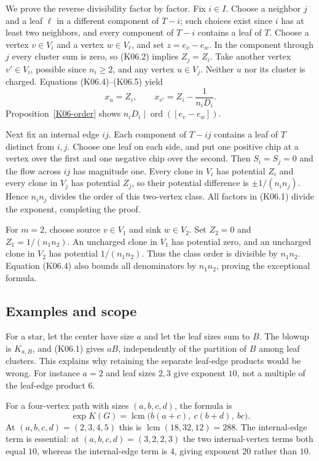 \documentclass[11pt,a4paper]{article}
\theoremstyle{definition}\newtheorem{definition}[theorem]{Definition}
\theoremstyle{remark}\newtheorem{remark}[theorem]{Remark}
\DeclareMathOperator{\ord}{ord}\DeclareMathOperator{\lcm}{lcm}\DeclareMathOperator{\im}{im}
\numberwithin{equation}{section}
\begin{document}
We prove the reverse divisibility factor by factor. Fix $i\in I$. Choose a neighbor $j$ and a leaf $\ell$ in a different component of $T-i$; such choices exist since $i$ has at least two neighbors, and every component of $T-i$ contains a leaf of $T$. Choose a vertex $v\in V_i$ and a vertex $w\in V_\ell$, and set $z=e_v-e_w$. In the component through $j$ every cluster sum is zero, so (K06.2) implies $Z_j=Z_i$. Take another vertex $v'\in V_i$, possible since $n_i\geq2$, and any vertex $u\in V_j$. Neither $u$ nor its cluster is charged. Equations (K06.4)--(K06.5) yield
\[
 x_u=Z_i,\qquad x_{v'}=Z_i-\frac1{n_iD_i}.
\]
Proposition~\ref{K06-order} shows $n_iD_i\mid\ord([e_v-e_w])$.

Next fix an internal edge $ij$. Each component of $T-ij$ contains a leaf of $T$ distinct from $i,j$. Choose one leaf on each side, and put one positive chip at a vertex over the first and one negative chip over the second. Then $S_i=S_j=0$ and the flow across $ij$ has magnitude one. Every clone in $V_i$ has potential $Z_i$ and every clone in $V_j$ has potential $Z_j$, so their potential difference is $\pm1/(n_in_j)$. Hence $n_in_j$ divides the order of this two-vertex class. All factors in (K06.1) divide the exponent, completing the proof.

For $m=2$, choose source $v\in V_1$ and sink $w\in V_2$. Set $Z_2=0$ and $Z_1=1/(n_1n_2)$. An uncharged clone in $V_1$ has potential zero, and an uncharged clone in $V_2$ has potential $1/(n_1n_2)$. Thus the class order is divisible by $n_1n_2$. Equation (K06.4) also bounds all denominators by $n_1n_2$, proving the exceptional formula.

\subsection{Examples and scope}\label{K06-sec-5}
For a star, let the center have size $a$ and let the leaf sizes sum to $B$. The blowup is $K_{a,B}$, and (K06.1) gives $aB$, independently of the partition of $B$ among leaf clusters. This explains why retaining the separate leaf-edge products would be wrong. For instance $a=2$ and leaf sizes $2,3$ give exponent $10$, not a multiple of the leaf-edge product $6$.

For a four-vertex path with sizes $(a,b,c,d)$, the formula is
\[
 \exp K(G)=\lcm\bigl(b(a+c),\ c(b+d),\ bc\bigr).             \tag{K06.8}
\]
At $(a,b,c,d)=(2,3,4,5)$ this is $\lcm(18,32,12)=288$. The internal-edge term is essential: at $(a,b,c,d)=(3,2,2,3)$ the two internal-vertex terms both equal $10$, whereas the internal-edge term is $4$, giving exponent $20$ rather than $10$.
\end{document}
